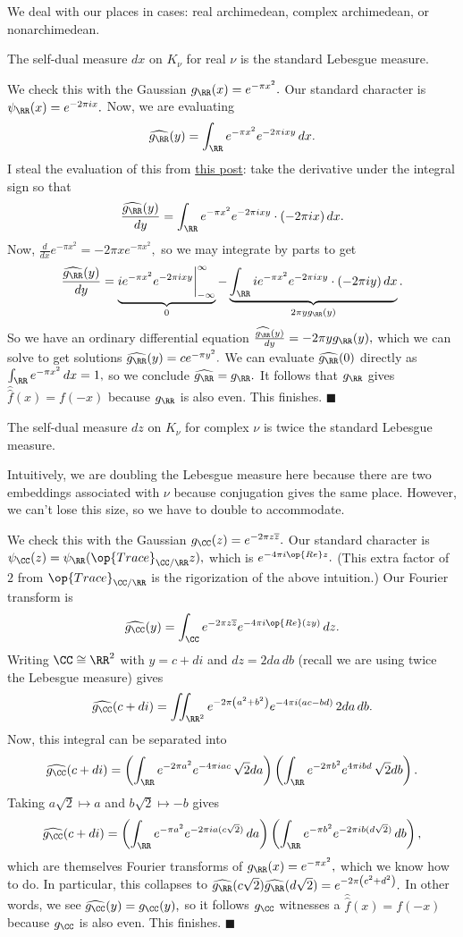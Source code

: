 We deal with our places in cases: real archimedean, complex archimedean, or nonarchimedean.
\begin{lemma}
    The self-dual measure $dx$ on $K_\nu$ for real $\nu$ is the standard Lebesgue measure.
\end{lemma}
We check this with the Gaussian $g_\RR(x)=e^{-\pi x^2}.$ Our standard character is $\psi_\RR(x)=e^{-2\pi ix}.$ Now, we are evaluating
\[\widehat{g_\RR}(y)=\int_\RR e^{-\pi x^2}e^{-2\pi ixy}\,dx.\]
I steal the evaluation of this from \href{https://math.stackexchange.com/a/270580/869257}{this post}: take the derivative under the integral sign so that
\[\frac{\widehat{g_\RR}(y)}{dy}=\int_\RR e^{-\pi x^2}e^{-2\pi ixy}\cdot(-2\pi ix)\,dx.\]
Now, $\frac d{dx}e^{-\pi x^2}=-2\pi xe^{-\pi x^2},$ so we may integrate by parts to get
\[\frac{\widehat{g_\RR}(y)}{dy}=\underbrace{ie^{-\pi x^2}e^{-2\pi ixy}\bigg|_{-\infty}^\infty}_0-\underbrace{\int_\RR ie^{-\pi x^2}e^{-2\pi ixy}\cdot(-2\pi iy)\,dx}_{2\pi yg_\RR(y)}.\]
So we have an ordinary differential equation $\frac{\widehat{g_\RR}(y)}{dy}=-2\pi yg_\RR(y),$ which we can solve to get solutions $\widehat{g_\RR}(y)=ce^{-\pi y^2}.$ We can evaluate $\widehat{g_\RR}(0)$ directly as $\int_\RR e^{-\pi x^2}\,dx=1,$ so we conclude $\widehat{g_{\RR}}=g_\RR.$ It follows that $g_\RR$ gives $\hat{\hat f}(x)=f(-x)$ because $g_\RR$ is also even. This finishes. $\blacksquare$

\begin{lemma}
    The self-dual measure $dz$ on $K_\nu$ for complex $\nu$ is twice the standard Lebesgue measure.
\end{lemma}
Intuitively, we are doubling the Lebesgue measure here because there are two embeddings associated with $\nu$ because conjugation gives the same place. However, we can't lose this size, so we have to double to accommodate.

We check this with the Gaussian $g_\CC(z)=e^{-2\pi z\overline z}.$ Our standard character is $\psi_\CC(z)=\psi_\RR(\op{Trace}_{\CC/\RR}z),$ which is $e^{-4\pi i\op{Re}z}.$ (This extra factor of $2$ from $\op{Trace}_{\CC/\RR}$ is the rigorization of the above intuition.) Our Fourier transform is
\[\widehat{g_\CC}(y)=\int_\CC e^{-2\pi z\overline z}e^{-4\pi i\op{Re}(zy)}\,dz.\]
Writing $\CC\cong\RR^2$ with $y=c+di$ and $dz=2da\,db$ (recall we are using twice the Lebesgue measure) gives
\[\widehat{g_\CC}(c+di)=\iint_{\RR^2}e^{-2\pi\left(a^2+b^2\right)}e^{-4\pi i(ac-bd)}\,2da\,db.\]
Now, this integral can be separated into
\[\widehat{g_\CC}(c+di)=\left(\int_\RR e^{-2\pi a^2}e^{-4\pi iac}\,\sqrt2da\right)\left(\int_\RR e^{-2\pi b^2}e^{4\pi ibd}\,\sqrt2db\right).\]
Taking $a\sqrt2\mapsto a$ and $b\sqrt2\mapsto-b$ gives
\[\widehat{g_\CC}(c+di)=\left(\int_\RR e^{-\pi a^2}e^{-2\pi ia(c\sqrt2)}\,da\right)\left(\int_\RR e^{-\pi b^2}e^{-2\pi ib(d\sqrt2)}\,db\right),\]
which are themselves Fourier transforms of $g_\RR(x)=e^{-\pi x^2},$ which we know how to do. In particular, this collapses to $\widehat{g_\RR}(c\sqrt2)\widehat{g_\RR}(d\sqrt2)=e^{-2\pi\left(c^2+d^2\right)}.$ In other words, we see $\widehat{g_\CC}(y)=g_\CC(y),$ so it follows $g_\CC$ witnesses a $\hat{\hat f}(x)=f(-x)$ because $g_\CC$ is also even. This finishes. $\blacksquare$

